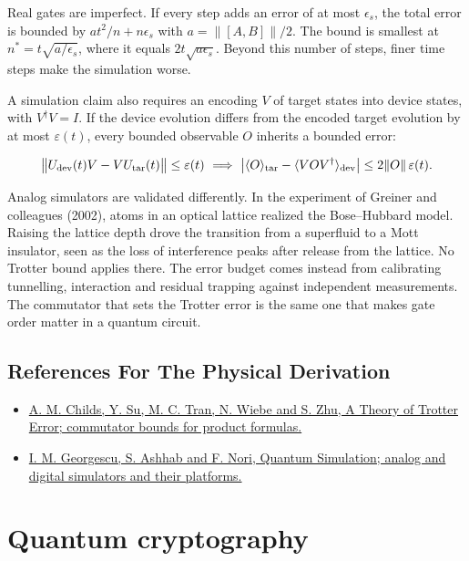 \documentclass[11pt,oneside]{book}
\newenvironment{centeredalign}{\[\begin{gathered}[c]}{\end{gathered}\]}
\begin{document}
Real gates are imperfect. If every step adds an error of at most \(\epsilon_s\), the total error is bounded by \(at^2/n+n\epsilon_s\) with \(a=\|[A,B]\|/2\). The bound is smallest at \(n^*=t\sqrt{a/\epsilon_s}\), where it equals \(2t\sqrt{a\epsilon_s}\). Beyond this number of steps, finer time steps make the simulation worse.

A simulation claim also requires an encoding \(V\) of target states into device states, with \(V^\dagger V=I\). If the device evolution differs from the encoded target evolution by at most \(\varepsilon(t)\), every bounded observable \(O\) inherits a bounded error:

\begin{centeredalign}
\big\|U_{\rm dev}(t)V-VU_{\rm tar}(t)\big\|\leq\varepsilon(t)\ \Longrightarrow\
\big|\langle O\rangle_{\rm tar}-\langle VOV^\dagger\rangle_{\rm dev}\big|\leq2\|O\|\,\varepsilon(t).
\end{centeredalign}

Analog simulators are validated differently. In the experiment of Greiner and colleagues (2002), atoms in an optical lattice realized the Bose--Hubbard model. Raising the lattice depth drove the transition from a superfluid to a Mott insulator, seen as the loss of interference peaks after release from the lattice. No Trotter bound applies there. The error budget comes instead from calibrating tunnelling, interaction and residual trapping against independent measurements. The commutator that sets the Trotter error is the same one that makes gate order matter in a quantum circuit.

\subsection*{References For The Physical Derivation}
\begin{itemize}
\item \href{https://arxiv.org/abs/1912.08854}{A. M. Childs, Y. Su, M. C. Tran, N. Wiebe and S. Zhu, A Theory of Trotter Error; commutator bounds for product formulas.}
\item \href{https://arxiv.org/abs/1308.6253}{I. M. Georgescu, S. Ashhab and F. Nori, Quantum Simulation; analog and digital simulators and their platforms.}
\end{itemize}





\clearpage

\section{Quantum cryptography}
\end{document}

